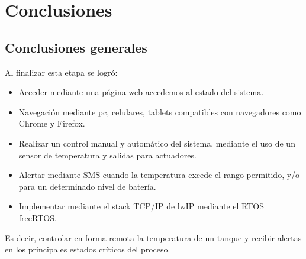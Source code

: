 
\chapter{Conclusiones} %

\label{Chapter5} %




\section{Conclusiones generales }


Al finalizar esta etapa se logró:
  \begin{itemize}
    \item Acceder mediante una página web accedemos al estado del sistema.
    \item Navegación mediante pc, celulares, tablets compatibles con navegadores como Chrome y Firefox.
    \item Realizar un control manual y automático del sistema, mediante el uso de un sensor de temperatura y salidas para actuadores. 
    \item Alertar mediante SMS cuando la temperatura excede el rango permitido, y/o para un determinado nivel de batería.
    \item Implementar mediante el stack TCP/IP de lwIP mediante el RTOS freeRTOS. 
   \end{itemize} 

Es decir, controlar en forma remota la temperatura de un tanque y recibir alertas en los principales estados críticos del proceso.



